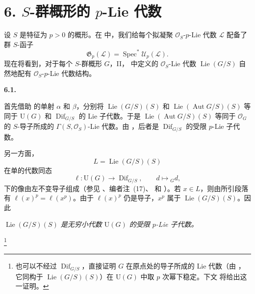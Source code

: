 
\section*{6. \(S\)-群概形的 \(p\)-Lie 代数}
\label{sga3:VIIA:6}

设 \(S\) 是特征为 \(p>0\) 的概形。在  中，我们给每个拟凝聚 \(\mathcal O_S\)-\(p\)-Lie 代数 \(\mathcal L\) 配备了群 \(S\)-函子
\[
  \mathfrak G_p(\mathcal L)
  =
  \operatorname{Spec}^{*}\mathcal U_p(\mathcal L).
\]
现在将看到，对于每个 \(S\)-群概形 \(G\)，II， 中定义的 \(\mathcal O_S\)-Lie 代数 \(\operatorname{Lie}(G/S)\) 自然地配有 \(\mathcal O_S\)-\(p\)-Lie 代数结构。

\medskip
\noindent\textbf{6.1.}
\label{sga3:VIIA:6.1}

首先借助  的单射 \(\alpha\) 和 \(\beta\)，分别将 \(\operatorname{Lie}(G/S)(S)\) 和 \(\operatorname{Lie}(\operatorname{Aut}G/S)(S)\) 等同于 \(\mathrm U(G)\) 和 \(\operatorname{Dif}_{G/S}\) 的 Lie 子代数。于是 \(\operatorname{Lie}(\operatorname{Aut}G/S)(S)\) 等同于 \(\mathcal O_G\) 的 \(S\)-导子所成的 \(\Gamma(S,\mathcal O_S)\)-Lie 代数。由 ，后者是 \(\operatorname{Dif}_{G/S}\) 的受限 \(p\)-Lie 子代数。

另一方面，
\[
  L=\operatorname{Lie}(G/S)(S)
\]
在单的代数同态
\[
  \ell:\mathrm U(G)\longrightarrow\operatorname{Dif}_{G/S},
  \qquad
  d\longmapsto {}_Gd,
\]
下的像由左不变导子组成（参见 、编者注~(17)、 和 ）。若 \(x\in L\)，则由所引段落有 \(\ell(x)^p=\ell(x^p)\)。由于 \(\ell(x)^p\) 仍是导子，\(x^p\) 属于 \(\operatorname{Lie}(G/S)(S)\)。因此
\begin{center}
  \textit{\(\operatorname{Lie}(G/S)(S)\) 是无穷小代数 \(\mathrm U(G)\) 的受限 \(p\)-Lie 子代数。}
\end{center}
\footnote{也可以不经过 \(\operatorname{Dif}_{G/S}\)，直接证明 \(G\) 在原点处的导子所成的 Lie 代数（由 ，它同构于 \(\operatorname{Lie}(G/S)(S)\)）在 \(\mathrm U(G)\) 中取 \(p\) 次幂下稳定。下文  将给出这一证明。}

